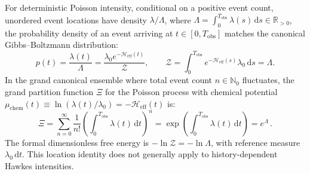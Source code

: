 \begin{theorem}
  \label{thm:partition_functions}
  For deterministic Poisson intensity, conditional on a positive event
  count, unordered event locations have density $\lambda/\Lambda$,
  where $\Lambda =
  \int_0^{T_{\mathrm{obs}}} \lambda(s)\,\mathrm{d}s \in
  \mathbb{R}_{>0}$, the probability density of an event arriving at
  $t \in [0, T_{\mathrm{obs}}]$ matches the canonical
  Gibbs--Boltzmann distribution:
  \begin{equation}
    p(t)=\frac{\lambda(t)}{\Lambda}
    =\frac{\lambda_0e^{-\mathcal H_{\mathrm{eff}}(t)}}{\mathcal Z},
    \qquad \mathcal Z=\int_0^{T_{\mathrm{obs}}}
    e^{-\mathcal H_{\mathrm{eff}}(s)}\lambda_0\,\mathrm{d}s=\Lambda.
    \label{eq:canonical_boltzmann}
  \end{equation}
  In the grand canonical ensemble where total event count $n \in
  \mathbb{N}_0$ fluctuates, the grand partition function $\Xi$ for
  the Poisson process with chemical potential
  $\mu_{\mathrm{chem}}(t) \equiv \ln(\lambda(t)/\lambda_0) =
  -\mathcal{H}_{\mathrm{eff}}(t)$ is:
  \begin{equation}
    \Xi = \sum_{n=0}^{\infty} \frac{1}{n!} \left(
    \int_0^{T_{\mathrm{obs}}} \lambda(t)\,\mathrm{d}t \right)^n
    = \exp\!\left( \int_0^{T_{\mathrm{obs}}}
    \lambda(t)\,\mathrm{d}t \right) = e^{\Lambda}\,.
    \label{eq:grand_partition}
  \end{equation}
  The formal dimensionless free energy is $-\ln\mathcal Z=-\ln\Lambda$,
  with reference measure $\lambda_0\,\mathrm{d}t$. This location identity
  does not generally apply to history-dependent Hawkes intensities.
\end{theorem}

